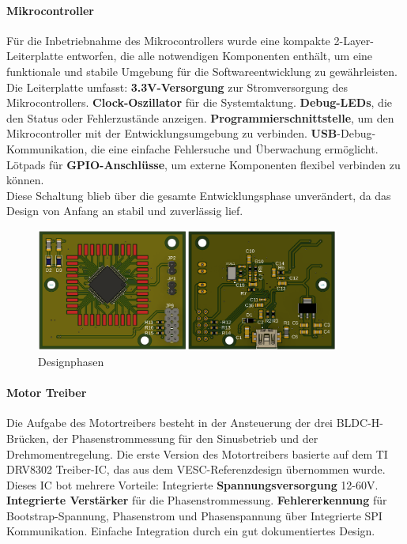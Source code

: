 \documentclass[paper=a4,11pt]{scrreprt}
\begin{document}
\paragraph{Mikrocontroller}
Für die Inbetriebnahme des Mikrocontrollers wurde eine kompakte 2-Layer-Leiterplatte entworfen, die alle notwendigen Komponenten enthält, um eine funktionale und stabile Umgebung für die Softwareentwicklung zu gewährleisten. Die Leiterplatte umfasst:
\textbf{3.3V-Versorgung} zur Stromversorgung des Mikrocontrollers.
\textbf{Clock-Oszillator} für die Systemtaktung.
\textbf{Debug-LEDs}, die den Status oder Fehlerzustände anzeigen.
\textbf{Programmierschnittstelle}, um den Mikrocontroller mit der Entwicklungsumgebung zu verbinden.
\textbf{USB}-Debug-Kommunikation, die eine einfache Fehlersuche und Überwachung ermöglicht.
Lötpads für \textbf{GPIO-Anschlüsse}, um externe Komponenten flexibel verbinden zu können.\\
Diese Schaltung blieb über die gesamte Entwicklungsphase unverändert, da das Design von Anfang an stabil und zuverlässig lief.
\begin{figure}[ht]
\begin{center}
\includegraphics[width=10cm]{Bilder/MCU_EVL.PNG}
\caption{Designphasen}
\label{mcuevl}
\end{center}
\end{figure}
\paragraph{Motor Treiber}
Die Aufgabe des Motortreibers besteht in der Ansteuerung der drei BLDC-H-Brücken, der Phasenstrommessung für den Sinusbetrieb und der Drehmomentregelung. Die erste Version des Motortreibers basierte auf dem TI DRV8302 Treiber-IC, das aus dem VESC-Referenzdesign übernommen wurde. Dieses IC bot mehrere Vorteile: Integrierte \textbf{Spannungsversorgung} 12-60V. \textbf{Integrierte Verstärker} für die Phasenstrommessung. \textbf{Fehlererkennung} für Bootstrap-Spannung, Phasenstrom und Phasenspannung über Integrierte SPI Kommunikation. Einfache Integration durch ein gut dokumentiertes Design.
\newpage
\end{document}
